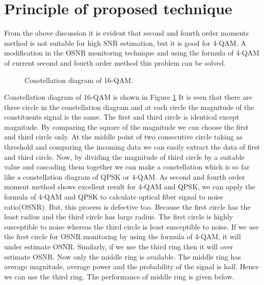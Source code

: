 \documentclass[12pt]{report}
\begin{document}
\section{Principle of proposed technique}
From the above discussion it is evident that second and fourth order moments method is not suitable for high SNR estimation, but it is good for 4-QAM. A modification in the OSNR monitoring technique and using the formula of 4-QAM of current second and fourth order method this problem can be solved.
\begin{figure}[htbp]
	\caption{Constellation diagram of 16-QAM.}
	\label{fig:qam16-constallation}
\end{figure}
Constellation diagram of 16-QAM is shown in Figure \ref{fig:qam16-constallation} It is seen that there are three circle in the constellation diagram and at each circle the magnitude of the constituents signal is the same. The first and third circle is identical except magnitude. By comparing the square of the magnitude we can choose the first and third circle only. At the middle point of two consecutive circle taking as threshold and comparing the incoming data we can easily extract the data of first and third circle. Now, by dividing the magnitude of third circle by a suitable value and cascading them together we can make a constellation which is so far like a constellation diagram of QPSK or 4-QAM.
As second and fourth order moment method shows excellent result for 4-QAM and QPSK, we can apply the formula of 4-QAM and QPSK to calculate optical fiber signal to noise ratio(OSNR). But, this process is defective too. Because the first circle has the least radius and the third circle has large radius. The first circle is highly susceptible to noise whereas the third circle is least susceptible to noise. If we use the first circle for OSNR monitoring by using the formula of 4-QAM, it will under estimate OSNR. Similarly, if we use the third ring then it will over estimate OSNR. Now only the middle ring is available. The middle ring has average magnitude, average power and the probability of the signal is half. Hence we can use the third ring. The performance of middle ring is given below.
\end{document}
